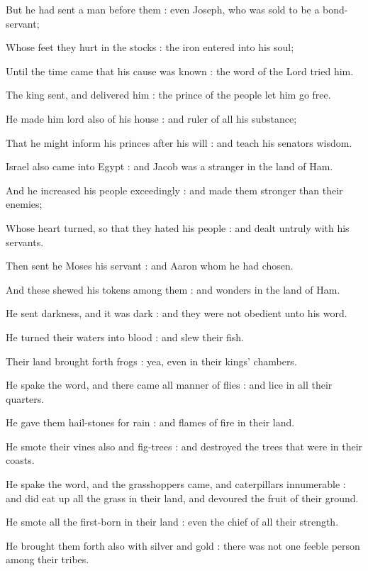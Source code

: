 But he had sent a man before them : even Joseph, who was sold to be a bond-servant;\par
{}Whose feet they hurt in the stocks : the iron entered into his soul;\par
{}Until the time came that his cause was known : the word of the Lord tried him.\par
{}The king sent, and delivered him : the prince of the people let him go free.\par
{}He made him lord also of his house : and ruler of all his substance;\par
{}That he might inform his princes after his will : and teach his senators wisdom.\par
{}Israel also came into Egypt : and Jacob was a stranger in the land of Ham.\par
{}And he increased his people exceedingly : and made them stronger than their enemies;\par
{}Whose heart turned, so that they hated his people : and dealt untruly with his servants.\par
{}Then sent he Moses his servant : and Aaron whom he had chosen.\par
{}And these shewed his tokens among them : and wonders in the land of Ham.\par
{}He sent darkness, and it was dark : and they were not obedient unto his word.\par
{}He turned their waters into blood : and slew their fish.\par
{}Their land brought forth frogs : yea, even in their kings' chambers.\par
{}He spake the word, and there came all manner of flies : and lice in all their quarters.\par
{}He gave them hail-stones for rain : and flames of fire in their land.\par
{}He smote their vines also and fig-trees : and destroyed the trees that were in their coasts.\par
{}He spake the word, and the grasshoppers came, and caterpillars innumerable : and did eat up all the grass in their land, and devoured the fruit of their ground.\par
{}He smote all the first-born in their land : even the chief of all their strength.\par
{}He brought them forth also with silver and gold : there was not one feeble person among their tribes.\par
